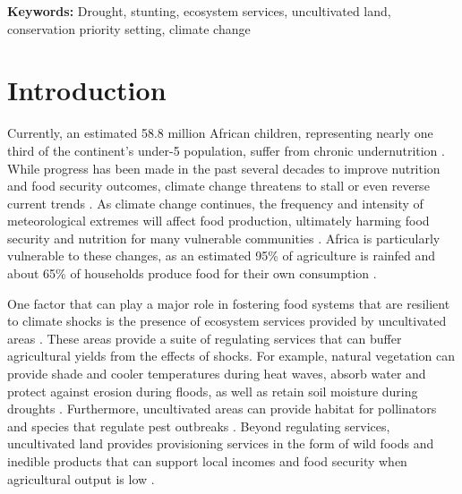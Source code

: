 \documentclass[titlepage]{article}
\begin{document}
\textbf{Keywords:} Drought, stunting, ecosystem services, uncultivated land, conservation priority setting, climate change

\linenumbers

\section{Introduction}

Currently, an estimated 58.8 million African children, representing nearly one third of the continent's under-5 population, suffer from chronic undernutrition \citep{unicef2019}.  While progress has been made in the past several decades to improve nutrition and food security outcomes, climate change threatens to stall or even reverse current trends \citep{FAO2018}.  As climate change continues, the frequency and intensity of meteorological extremes will affect food production, ultimately harming food security and nutrition for many vulnerable communities \citep{niles2020climate}.  Africa is particularly vulnerable to these changes, as an estimated 95\% of agriculture is rainfed \citep{Wani2009} and about 65\% of households produce food for their own consumption \citep{Runge2004}.

One factor that can play a major role in fostering food systems that are resilient to climate shocks is the presence of ecosystem services provided by uncultivated areas \citep{Reed2016, Pascual2017, Daily2008}.  These areas provide a suite of regulating services that can buffer agricultural yields from the effects of shocks.  For example, natural vegetation can provide shade and cooler temperatures during heat waves, absorb water and protect against erosion during floods, as well as retain soil moisture during droughts \citep{Siriri2013, Lott2009}.  Furthermore, uncultivated areas can provide habitat for pollinators and species that regulate pest outbreaks \citep{Karp2013}.  Beyond regulating services, uncultivated land provides provisioning services in the form of wild foods and inedible products that can support local incomes and food security when agricultural output is low \citep{friant2019life, morgan2020secret, powell2015improving, Assogbadjo2012}.
\end{document}
